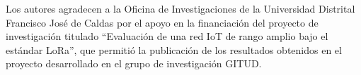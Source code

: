 
Los autores agradecen a la Oficina de Investigaciones de la Universidad Distrital Francisco José de Caldas por el apoyo en la financiación del proyecto de investigación titulado ``Evaluación de una red IoT de rango amplio bajo el estándar LoRa'', que permitió la publicación de los resultados obtenidos en el proyecto desarrollado en el grupo de investigación GITUD.
